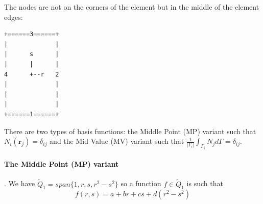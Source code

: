 The nodes are not on the corners of the element but in the middle of the
element edges:



\begin{verbatim}
+======3======+
|             |
|      s      |
|      |      |
4      +--r   2
|             |
|             |
|             |
+======1======+
\end{verbatim}

There are two types of basis functions: the Middle Point (MP) variant
such that $N_i({\bm r}_j)=\delta_{ij}$ and the Mid Value (MV) variant
such that $\frac{1}{|\Gamma_i|} \int_{\Gamma_i} N_j d\Gamma = \delta_{ij}$.

\paragraph{The Middle Point (MP) variant}. 
We have $\tilde{Q}_1=span \{ 1,r,s,r^2-s^2 \}$
so a function $f \in \tilde{Q}_1$  is such that 
\begin{equation}
f(r,s)= a + b r + c s + d(r^2-s^2 )
\label{nonpsf}
\end{equation}

